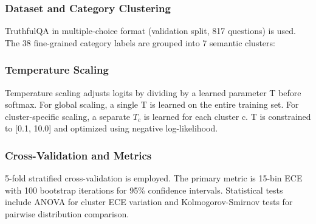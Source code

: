 
\subsubsection{Dataset and Category Clustering}

TruthfulQA in multiple-choice format (validation split, 817 questions) is used. The 38 fine-grained category labels are grouped into 7 semantic clusters:

\begin{table}[htbp]
\centering
{}
\end{table}

\subsubsection{Temperature Scaling}

Temperature scaling adjusts logits by dividing by a learned parameter T before softmax. For global scaling, a single T is learned on the entire training set. For cluster-specific scaling, a separate $T_c$ is learned for each cluster c. T is constrained to [0.1, 10.0] and optimized using negative log-likelihood.

\subsubsection{Cross-Validation and Metrics}

5-fold stratified cross-validation is employed. The primary metric is 15-bin ECE with 100 bootstrap iterations for 95\% confidence intervals. Statistical tests include ANOVA for cluster ECE variation and Kolmogorov-Smirnov tests for pairwise distribution comparison.
